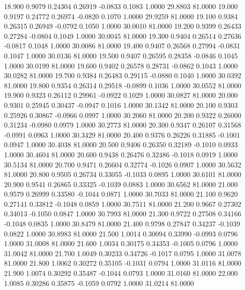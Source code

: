   18.900   0.9079   0.24304   0.26919  -0.0833   0.1083   1.0000  29.8803  81.0000
  19.000   0.9197   0.24772   0.26974  -0.0820   0.1070   1.0000  29.9259  81.0000
  19.100   0.9384   0.26315   0.26949  -0.0792   0.1050   1.0000  30.0010  81.0000
  19.200   0.9399   0.26433   0.27284  -0.0804   0.1049   1.0000  30.0045  81.0000
  19.300   0.9404   0.26514   0.27636  -0.0817   0.1048   1.0000  30.0086  81.0000
  19.400   0.9407   0.26568   0.27994  -0.0831   0.1047   1.0000  30.0136  81.0000
  19.500   0.9407   0.26595   0.28358  -0.0846   0.1045   1.0000  30.0199  81.0000
  19.600   0.9402   0.26578   0.28731  -0.0862   0.1043   1.0000  30.0282  81.0000
  19.700   0.9384   0.26483   0.29115  -0.0880   0.1040   1.0000  30.0392  81.0000
  19.800   0.9354   0.26314   0.29518  -0.0899   0.1036   1.0000  30.0552  81.0000
  19.900   0.9323   0.26112   0.29961  -0.0922   0.1029   1.0000  30.0827  81.0000
  20.000   0.9301   0.25945   0.30437  -0.0947   0.1016   1.0000  30.1342  81.0000
  20.100   0.9303   0.25926   0.30867  -0.0966   0.0997   1.0000  30.2060  81.0000
  20.200   0.9322   0.26000   0.31234  -0.0980   0.0979   1.0000  30.2773  81.0000
  20.300   0.9347   0.26107   0.31568  -0.0991   0.0963   1.0000  30.3429  81.0000
  20.400   0.9376   0.26226   0.31885  -0.1001   0.0947   1.0000  30.4038  81.0000
  20.500   0.9406   0.26350   0.32189  -0.1010   0.0933   1.0000  30.4604  81.0000
  20.600   0.9438   0.26476   0.32486  -0.1018   0.0919   1.0000  30.5134  81.0000
  20.700   0.9471   0.26604   0.32774  -0.1026   0.0907   1.0000  30.5632  81.0000
  20.800   0.9505   0.26734   0.33055  -0.1033   0.0895   1.0000  30.6101  81.0000
  20.900   0.9541   0.26865   0.33325  -0.1039   0.0883   1.0000  30.6562  81.0000
  21.000   0.9579   0.26999   0.33580  -0.1044   0.0871   1.0000  30.7033  81.0000
  21.100   0.9620   0.27141   0.33812  -0.1048   0.0859   1.0000  30.7511  81.0000
  21.200   0.9667   0.27302   0.34013  -0.1050   0.0847   1.0000  30.7993  81.0000
  21.300   0.9722   0.27508   0.34166  -0.1048   0.0835   1.0000  30.8479  81.0000
  21.400   0.9798   0.27847   0.34237  -0.1039   0.0822   1.0000  30.8983  81.0000
  21.500   1.0014   0.30094   0.33990  -0.0993   0.0796   1.0000  31.0008  81.0000
  21.600   1.0034   0.30175   0.34353  -0.1005   0.0796   1.0000  31.0042  81.0000
  21.700   1.0049   0.30233   0.34726  -0.1017   0.0795   1.0000  31.0078  81.0000
  21.800   1.0062   0.30272   0.35105  -0.1031   0.0794   1.0000  31.0116  81.0000
  21.900   1.0074   0.30292   0.35487  -0.1044   0.0793   1.0000  31.0160  81.0000
  22.000   1.0085   0.30286   0.35875  -0.1059   0.0792   1.0000  31.0214  81.0000
